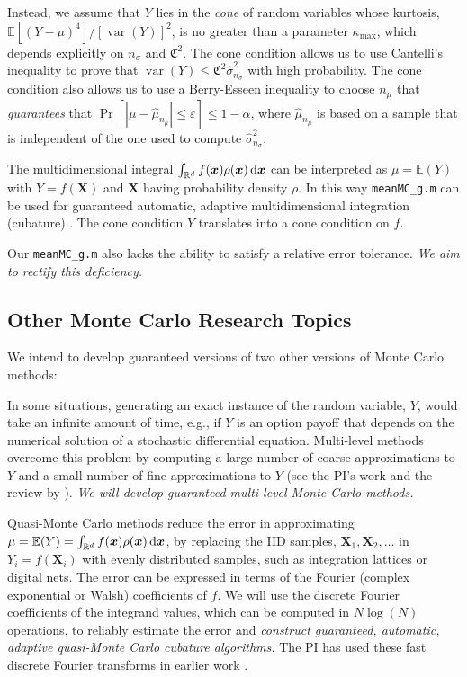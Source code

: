 \documentclass[11pt]{NSFamsart}
\def\reals{{\mathbb{R}}}
\newcommand{\bbE}{\mathbb{E}}
\DeclareMathOperator*{\var}{var}
\newcommand{\bx}{{\boldsymbol{x}}}
\newcommand{\bX}{{\boldsymbol{X}}}
\def\dif{\textup{d}}
\newcommand{\fC}{\mathfrak{C}}
\def\abs#1{\ensuremath{\left \lvert #1 \right \rvert}}
\newcommand{\hmu}{\hat{\mu}}
\newcommand{\hsigma}{\hat{\sigma}}
\begin{document}
Instead, we assume that $Y$ lies in the \emph{cone} of random variables whose kurtosis, $\bbE[(Y-\mu)^4]/[\var(Y)]^2$, is no greater than a parameter $\kappa_{\max}$, which depends explicitly on $n_{\sigma}$ and $\fC^2$.  The cone condition allows us to use Cantelli's inequality to prove that $\var(Y)\le \fC^2\hsigma_{n_\sigma}^2$ with high probability.  The cone condition also allows us to use a Berry-Esseen inequality to choose $n_{\mu}$ that \emph{guarantees} that $\Pr[\abs{\mu-\hmu_{n_{\mu}}} \le \varepsilon]\le 1-\alpha$, where $\hmu_{n_{\mu}}$ is based on a sample that is independent of the one used to compute $\hsigma_{n_\sigma}^2$.

The multidimensional integral $\int_{\reals^d} f(\bx) \rho(\bx) \, \dif \bx$ can be interpreted as $\mu=\bbE(Y)$ with $Y=f(\bX)$ and $\bX$ having probability density $\rho$. In this way {\tt meanMC\_g.m} can be used for guaranteed automatic, adaptive multidimensional integration (cubature) \citep{HicEtal14a}.  The cone condition $Y$ translates into a cone condition on $f$.

Our {\tt meanMC\_g.m} also lacks the ability to satisfy a relative error tolerance. \emph{We aim to rectify this deficiency.}

\subsection{Other Monte Carlo Research Topics} We intend to develop guaranteed versions of two other versions of Monte Carlo methods:
\begin{description}[leftmargin=2.5ex]
\item[Multi-Level Monte Carlo] In some situations, generating an exact instance of the random variable, $Y$, would take an infinite amount of time, e.g., if $Y$ is an option payoff that depends on the numerical solution of a stochastic differential equation.  Multi-level methods overcome this problem by computing a large number of coarse approximations to $Y$ and a small number of fine approximations to $Y$ (see the PI's work \citep{NiuHic09a, NiuHic09b} and the review by \cite{Gil14a}).  \emph{We will develop guaranteed multi-level Monte Carlo methods.}

\item[Quasi-Monte Carlo] Quasi-Monte Carlo methods \citep{DicEtal14a} reduce the error in approximating $\mu=\bbE(Y)=\int_{\reals^d} f(\bx) \rho(\bx) \, \dif \bx$, by replacing the IID samples, $\bX_1, \bX_2, \ldots$ in $Y_i=f(\bX_i)$ with evenly distributed samples, such as integration lattices or digital nets.  The error can be expressed in terms of the Fourier (complex exponential or Walsh) coefficients of $f$.  We will use the discrete Fourier coefficients of the integrand values, which can be computed in $N \log(N)$ operations, to reliably estimate the error and \emph{construct guaranteed, automatic, adaptive quasi-Monte Carlo cubature algorithms.} The PI has used these fast discrete Fourier transforms in earlier work \citep{LiHic03a,DicHicLiu07a}.

\end{description}
\end{document}
